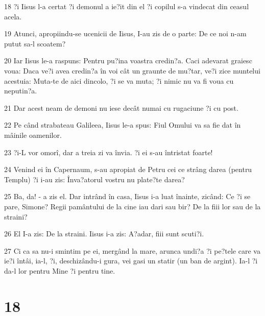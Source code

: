 \par 18 ?i Iisus l-a certat ?i demonul a ie?it din el ?i copilul s-a vindecat din ceasul acela.
\par 19 Atunci, apropiindu-se ucenicii de Iisus, I-au zis de o parte: De ce noi n-am putut sa-l scoatem?
\par 20 Iar Iisus le-a raspuns: Pentru pu?ina voastra credin?a. Caci adevarat graiesc voua: Daca ve?i avea credin?a în voi cât un graunte de mu?tar, ve?i zice muntelui acestuia: Muta-te de aici dincolo, ?i se va muta; ?i nimic nu va fi voua cu neputin?a.
\par 21 Dar acest neam de demoni nu iese decât numai cu rugaciune ?i cu post.
\par 22 Pe când strabateau Galileea, Iisus le-a spus: Fiul Omului va sa fie dat în mâinile oamenilor.
\par 23 ?i-L vor omorî, dar a treia zi va învia. ?i ei s-au întristat foarte!
\par 24 Venind ei în Capernaum, s-au apropiat de Petru cei ce strâng darea (pentru Templu) ?i i-au zis: Înva?atorul vostru nu plate?te darea?
\par 25 Ba, da! - a zis el. Dar intrând în casa, Iisus i-a luat înainte, zicând: Ce ?i se pare, Simone? Regii pamântului de la cine iau dari sau bir? De la fiii lor sau de la straini?
\par 26 El I-a zis: De la straini. Iisus i-a zis: A?adar, fiii sunt scuti?i.
\par 27 Ci ca sa nu-i smintim pe ei, mergând la mare, arunca undi?a ?i pe?tele care va ie?i întâi, ia-l, ?i, deschizându-i gura, vei gasi un statir (un ban de argint). Ia-l ?i da-l lor pentru Mine ?i pentru tine.

\chapter{18}

